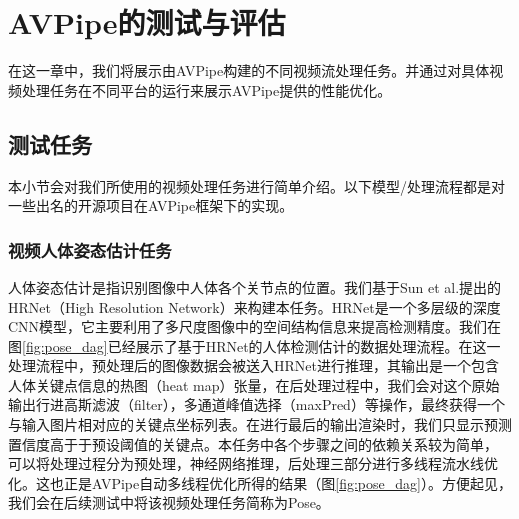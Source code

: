 
\chapter{AVPipe的测试与评估}

在这一章中，我们将展示由AVPipe构建的不同视频流处理任务。并通过对具体视频处理任务在不同平台的运行来展示AVPipe提供的性能优化。

\section{测试任务}
本小节会对我们所使用的视频处理任务进行简单介绍。以下模型/处理流程都是对一些出名的开源项目在AVPipe框架下的实现。

\subsection{视频人体姿态估计任务}
人体姿态估计是指识别图像中人体各个关节点的位置。我们基于Sun et al.提出的HRNet（High Resolution Network）\cite{sun2019deep}来构建本任务。HRNet是一个多层级的深度CNN模型，它主要利用了多尺度图像中的空间结构信息来提高检测精度。我们在图\ref{fig:pose_dag}已经展示了基于HRNet的人体检测估计的数据处理流程。在这一处理流程中，预处理后的图像数据会被送入HRNet进行推理，其输出是一个包含人体关键点信息的热图（heat map）张量，在后处理过程中，我们会对这个原始输出行进高斯滤波（filter），多通道峰值选择（maxPred）等操作，最终获得一个与输入图片相对应的关键点坐标列表。在进行最后的输出渲染时，我们只显示预测置信度高于于预设阈值的关键点。本任务中各个步骤之间的依赖关系较为简单，
可以将处理过程分为预处理，神经网络推理，后处理三部分进行多线程流水线优化。这也正是AVPipe自动多线程优化所得的结果（图\ref{fig:pose_dag}）。方便起见，我们会在后续测试中将该视频处理任务简称为Pose。

